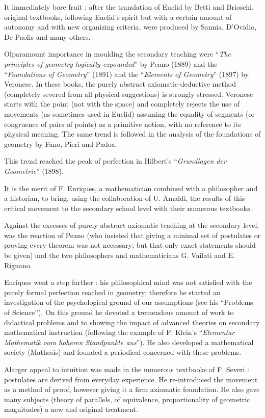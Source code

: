 It immediately bore fruit : after the translation of Euclid by Betti and Brioschi, original textbooks, following Euclid's spirit but with a certain amount of autonomy and with new organizing criteria, were produced by Sannia, D'Ovidio, De Paolis and many others.

Of\pageoriginale paramount importance in moulding the secondary teaching were ``{\em The principles of geometry logically expounded}'' by Peano (1889) and the ``{\em Foundations of Geometry}'' (1891) and the ``{\em Elements of Geometry}'' (1897) by Veronese. In these books, the purely abstract axiomatic-deductive method (completely severed from all physical suggestions) is strongly stressed. Veronese starts with the point (not with the space) and completely rejects the use of movements (as sometimes used in Euclid) assuming the equality of segments (or congruence of pairs of points) as a primitive notion, with no reference to its physical meaning. The same trend is followed in the analysis of the foundations of geometry by Fano, Pieri and Padoa.

This trend reached the peak of perfection in Hilbert's ``{\em Grundlagen der Geometrie}'' (1898).

It is the merit of F. Enriques, a mathematician combined with a philosopher and a historian, to bring, using the collaboration of U. Amaldi, the results of this critical movement to the secondary school level with their numerous textbooks.

Against the excesses of purely abstract axiomatic teaching at the secondary level, was the reaction of Peano (who insisted that giving a minimal set of postulates or proving every theorem was not necessary; but that only exact statements should be given) and the two philosophers and mathematicians G. Vailati and E. Rignano.

Enriques went a step farther : his philosophical mind was not satisfied with the purely formal perfection reached in geometry; therefore he started an investigation of the psychological ground of our assumptions (see his ``Problems of Science''). On this ground he devoted a tremendous amount of work to didactical problems and to showing the impact of advanced theories on secondary mathematical instruction (following the example of F. Klein's ``{\em Elementar Mathematik vom hoheren Standpunkte aus}''). He also developed a mathematical society (Mathesis) and founded a periodical concerned with these problems.

A\pageoriginale larger appeal to intuition was made in the numerous textbooks of F. Severi : postulates are derived from everyday experience. He re-introduced the movement as a method of proof, however giving it a firm axiomatic foundation. He also gave many subjects (theory of parallels, of equivalence, proportionality of geometric magnitudes) a new and original treatment.

